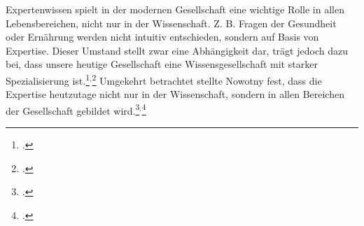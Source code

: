 Expertenwissen spielt in der modernen Gesellschaft eine wichtige Rolle in allen Lebensbereichen, nicht nur in der Wissenschaft. Z. B. Fragen der Gesundheit oder Ernährung werden nicht intuitiv entschieden, sondern auf Basis von Expertise. Dieser Umstand stellt zwar eine Abhängigkeit dar, trägt jedoch dazu bei, dass unsere heutige Gesellschaft eine Wissensgesellschaft mit starker Spezialisierung ist.\footcite[Vgl.][o.S.]{Coser_1992}$^,$\footcite[Vgl.][S. 10]{Bogner_2014_Interview}
Umgekehrt betrachtet stellte Nowotny fest, dass die Expertise heutzutage nicht nur in der Wissenschaft, sondern in allen Bereichen der Gesellschaft gebildet wird.\footcite[Vgl.][S. 215 ff. ]{Nowotny_2001}$^,$\footcite[Vgl.][S. 10]{Bogner_2014_Interview}
%
%

%
%

